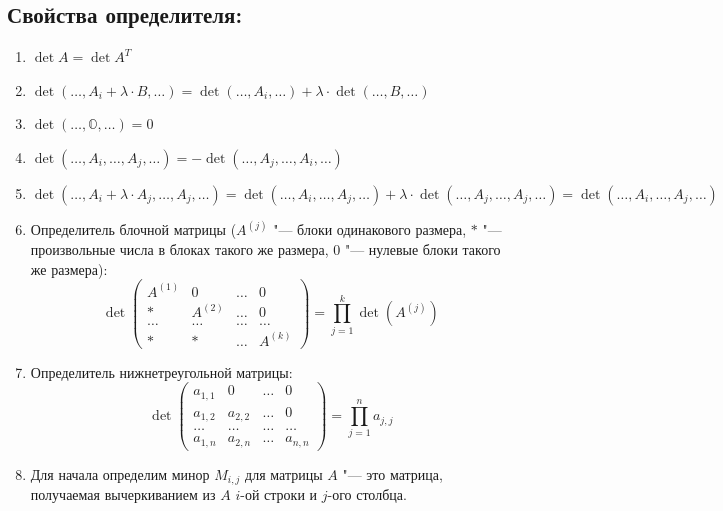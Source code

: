 \documentclass{article}
\begin{document}
\subsection{Свойства определителя:}
\begin{enumerate}
	\item $\operatorname{det}A = \operatorname{det}A^T$
	\item $\operatorname{det}(\ldots, A_i+\lambda\cdot B,\ldots) = \operatorname{det}(\ldots, A_i, \ldots) + \lambda\cdot \operatorname{det}(\ldots, B, \ldots)$
	\item $\operatorname{det}(\ldots, \mathbb{O}, \ldots) = 0$
	\item $\operatorname{det}(\ldots, A_i, \ldots, A_j, \ldots) = -\operatorname{det}(\ldots, A_j, \ldots, A_i, \ldots)$
	\item $\operatorname{det}(\ldots, A_i + \lambda\cdot A_j, \ldots, A_j, \ldots) = \operatorname{det}(\ldots, A_i, \ldots, A_j, \ldots) + \lambda\cdot\operatorname{det}(\ldots, A_j, \ldots, A_j, \ldots) = \operatorname{det}(\ldots, A_i, \ldots, A_j, \ldots)$
	\item Определитель блочной матрицы ($A^{(j)}$ "--- блоки одинакового размера, $*$ "--- произвольные числа в блоках такого же размера, $0$ "--- нулевые блоки такого же размера):
	\begin{equation*}\operatorname{det}
	\begin{pmatrix}
		A^{(1)}& 0& \ldots&0\\
		* & A^{(2)} & \ldots & 0\\
		\ldots & \ldots & \ldots & \ldots\\
		* & * & \ldots & A^{(k)}  
	\end{pmatrix} = \prod_{j = 1}^k \operatorname{det}(A^{(j)})
	\end{equation*}
	\item Определитель нижнетреугольной матрицы:
	\begin{equation*}\operatorname{det}
	\begin{pmatrix}
	a_{1, 1} & 0 & \ldots & 0\\
	a_{1, 2} & a_{2, 2} & \ldots & 0\\
	\ldots &\ldots &\ldots& \ldots\\
	a_{1, n} & a_{2, n} & \ldots & a_{n, n}
	\end{pmatrix} = \prod_{j = 1}^{n} a_{j, j}
	\end{equation*}
	\item Для начала определим минор $M_{i, j}$ для матрицы $A$ "--- это матрица, получаемая вычеркиванием из $A$ $i$-ой строки и $j$-ого столбца.

\end{enumerate}
\end{document}
